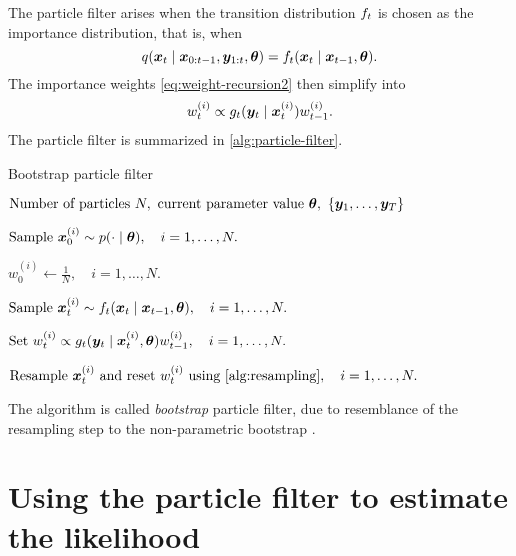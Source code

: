 The particle filter arises when the transition distribution $f_t$ is chosen as the importance distribution, that is, when
\begin{equation*}
q(\bm{x}_t \mid \bm{x}_{0:t-1}, \bm{y}_{1:t}, \bm{\theta}) = f_t(\bm{x}_t \mid \bm{x}_{t-1}, \bm{\theta}).
\end{equation*}
The importance weights \eqref{eq:weight-recursion2} then simplify into
\begin{equation} \label{eq:weight-recursion3}
w_t^{(i)} \propto g_t(\bm{y}_t \mid \bm{x}_t^{(i)}) w_{t-1}^{(i)}.
\end{equation}
The particle filter is summarized in \autoref{alg:particle-filter}.
\begin{algorithm}[ht]
    \caption{Bootstrap particle filter}
    \label{alg:particle-filter}
    \begin{algorithmic}[1]
        \Input $\text{Number of particles } N,\ \text{current parameter value } \btheta,\ \left\{\by_1, \ldots, \by_T\right\}$
        
        \State $\text{Sample } \bm{x}_0^{(i)} \sim p(\cdot \mid \bm{\theta}), \quad i = 1, \ldots, N.$ 
        
        \State $w_0^{(i)} \gets \frac{1}{N}, \quad i = 1, \ldots, N.$ 
        
        \State $\text{Sample } \bm{x}_t^{(i)} \sim f_t(\bm{x}_t \mid \bm{x}_{t-1}, \bm{\theta}), \quad i = 1, \ldots, N.$ 
        
        \State $\text{Set } w_t^{(i)} \propto g_t(\bm{y}_t \mid \bm{x}_t^{(i)}, \bm{\theta}) w_{t-1}^{(i)}, \quad i = 1, \ldots, N.$ 
        
        \State $\text{Resample } \bx_t^{(i)} \text{ and reset } w_t^{(i)} \text{ using \autoref{alg:resampling}}, \quad i = 1, \ldots, N.$
        \EndFor
    \end{algorithmic}
\end{algorithm}
The algorithm is called \emph{bootstrap} particle filter, due to resemblance of the resampling step to the non-parametric bootstrap \citep{bootstrap}.



\section{Using the particle filter to estimate the likelihood} \label{sec:particle-filter-estimate}

